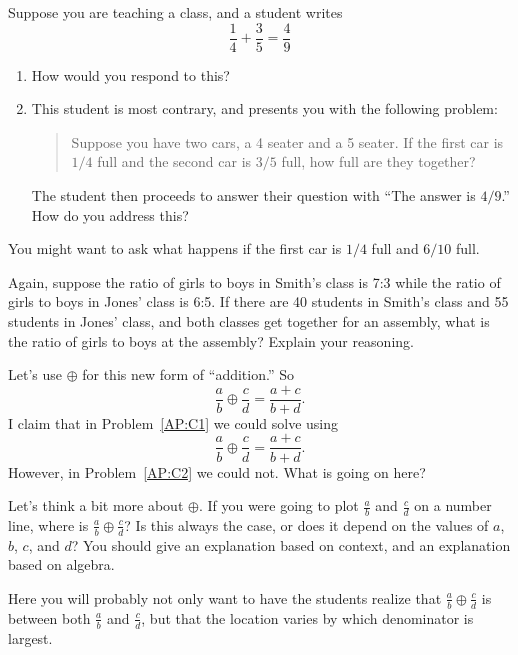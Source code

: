 \begin{prob}
Suppose you are teaching a class, and a student writes
\[
\frac{1}{4} + \frac{3}{5} = \frac{4}{9}
\]
\begin{enumerate}
\item How would you respond to this? 
\item This student is most contrary, and presents you with the following problem:
\begin{quote}
Suppose you have two cars, a 4 seater and a 5 seater. If the first car
is $1/4$ full and the second car is $3/5$ full, how full are they
together?
\end{quote}
The student then proceeds to answer their question with ``The answer
is $4/9$.'' How do you address this?
\end{enumerate}
\begin{teachingnote}
You might want to ask what happens if the first car is $1/4$ full and $6/10$ full.
\end{teachingnote}
\end{prob}



\begin{prob}\label{AP:C2}
Again, suppose the ratio of girls to boys in Smith's class is 7:3
while the ratio of girls to boys in Jones' class is 6:5.  If there are
40 students in Smith's class and 55 students in Jones' class, and both
classes get together for an assembly, what is the ratio of girls to
boys at the assembly? Explain your reasoning.
\end{prob}


\begin{prob} 
Let's use $\oplus$ for this new form of ``addition.'' So
\[
\frac{a}{b} \oplus \frac{c}{d} = \frac{a+c}{b+d}.
\]
I claim that in Problem~\ref{AP:C1} we could solve using
\[
\frac{a}{b} \oplus \frac{c}{d} = \frac{a+c}{b+d}.
\]
However, in Problem~\ref{AP:C2} we could not. What is going on here?
\end{prob}



\begin{prob} 
Let's think a bit more about $\oplus$. If you were going to plot
$\frac{a}{b}$ and $\frac{c}{d}$ on a number line, where is
$\frac{a}{b} \oplus \frac{c}{d}$? Is this always the case, or does it
depend on the values of $a$, $b$, $c$, and $d$? You should give an
explanation based on context, and an explanation based on algebra.
\end{prob}

\begin{teachingnote}
Here you will probably not only want to have the students realize that
$\frac{a}{b} \oplus \frac{c}{d}$ is between both $\frac{a}{b}$ and
$\frac{c}{d}$, but that the location varies by which denominator is
largest.
\end{teachingnote}



